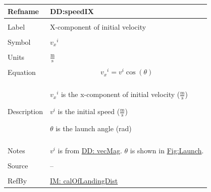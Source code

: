 \documentclass[12pt]{article}
\begin{document}
\noindent \begin{minipage}{\textwidth}
\begin{tabular}{p{} p{}}
\toprule \textbf{Refname} & \textbf{DD:speedIX}
\label{DD:speedIX}
\\ \midrule \\
Label & X-component of initial velocity
\\ \midrule \\
Symbol & ${{v_{x}}^{i}}$
\\ \midrule \\
Units & $\frac{\text{m}}{\text{s}}$
\\ \midrule \\
Equation & \begin{displaymath}
           {{v_{x}}^{i}}={v^{i}} \cos\left(θ\right)
           \end{displaymath}
\\ \midrule \\
Description & \begin{symbDescription}
              \item{${{v_{x}}^{i}}$ is the x-component of initial velocity ($\frac{\text{m}}{\text{s}}$)}
              \item{${v^{i}}$ is the initial speed ($\frac{\text{m}}{\text{s}}$)}
              \item{$θ$ is the launch angle (rad)}
              \end{symbDescription}
\\ \midrule \\
Notes & ${v^{i}}$ is from \hyperref[DD:vecMag]{DD: vecMag}.
        $θ$ is shown in \hyperref[Figure:Launch]{Fig:Launch}.
\\ \midrule \\
Source & --
\\ \midrule \\
RefBy & \hyperref[IM:calOfLandingDist]{IM: calOfLandingDist}
\\ \bottomrule \end{tabular}
\end{minipage}
\par~
\end{document}
